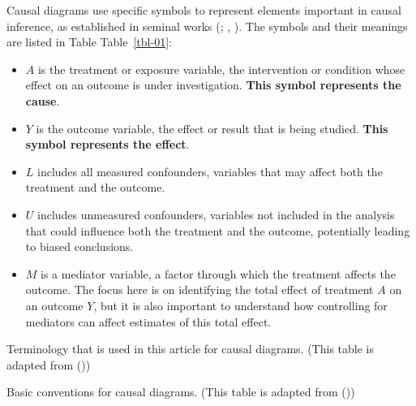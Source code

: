 \documentclass[
  singlecolumn]{article}
\providecommand{\tightlist}{%
  \setlength{\itemsep}{0pt}\setlength{\parskip}{0pt}}\usepackage{longtable,booktabs,array}
\begin{document}
Causal diagrams use specific symbols to represent elements important in
causal inference, as established in seminal works
(;
, ).
The symbols and their meanings are listed in Table Table~\ref{tbl-01}:

\begin{itemize}
\tightlist
\item
  \textbf{\(A\)} is the treatment or exposure variable, the intervention
  or condition whose effect on an outcome is under investigation.
  \textbf{This symbol represents the cause}.
\item
  \textbf{\(Y\)} is the outcome variable, the effect or result that is
  being studied. \textbf{This symbol represents the effect}.
\item
  \textbf{\(L\)} includes all measured confounders, variables that may
  affect both the treatment and the outcome.
\item
  \textbf{\(U\)} includes unmeasured confounders, variables not included
  in the analysis that could influence both the treatment and the
  outcome, potentially leading to biased conclusions.
\item
  \textbf{\(M\)} is a mediator variable, a factor through which the
  treatment affects the outcome. The focus here is on identifying the
  total effect of treatment \(A\) on an outcome \(Y\), but it is also
  important to understand how controlling for mediators can affect
  estimates of this total effect.
\end{itemize}

\begin{table}

\caption{\label{tbl-01}Terminology that is used in this article for
causal diagrams. (This table is adapted from
())}

\centering{

\terminologylocalconventionssimple

}

\end{table}%

\begin{table}

\caption{\label{tbl-02}Basic conventions for causal diagrams. (This
table is adapted from ())}

\centering{

\terminologygeneralbasic

}

\end{table}%
\end{document}
